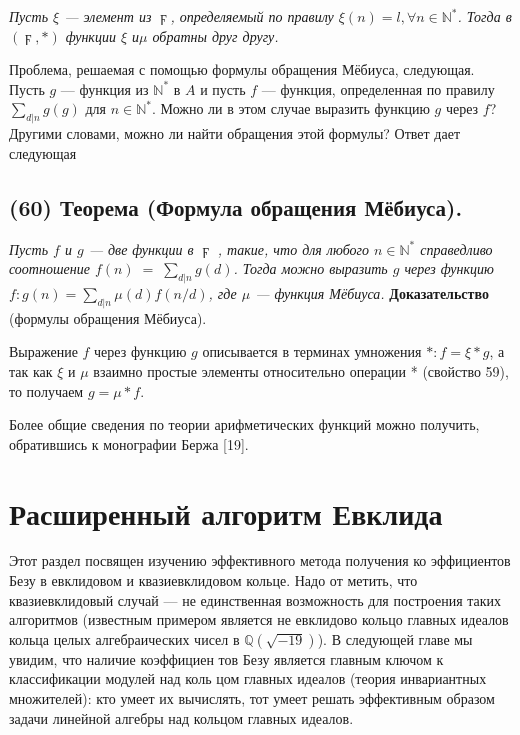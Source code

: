 \documentclass{mai_book}
\begin{document}
\textit{Пусть $\xi$ — элемент из $\digamma$, определяемый по правилу $\xi(n)=l,\forall n\in\mathbb{N}^*$. Тогда в $(\digamma,*)$ функции $\xi$ и$\mu$ обратны друг другу.}

Проблема, решаемая с помощью формулы обращения Мёбиуса, следующая. Пусть $g$ — функция из $\mathbb{N}^*$ в $A$ и пусть $f$ — функция, определенная по правилу $\sum\nolimits_{d|n}g(g)$ для $n\in\mathbb{N}^*$. Можно ли в этом случае выразить функцию $g$ через $f$? Другими словами, можно ли найти обращения этой формулы? Ответ дает следующая

\subsection*{(60) Теорема (Формула обращения Мёбиуса).}

\textit{Пусть $f$ и $g$ — две функции в $\digamma$ , такие, что для любого $n\in\mathbb{N}^*$ справедливо соотношение $f(n)\;=\;\sum\nolimits_{d|n}g(d)$. Тогда можно выразить $g$
через функцию $f: g(n)=\sum\nolimits_{d|n}\mu(d)f(n/d)$, где $\mu$ — функция Мёбиуса.}
\newpage
\textbf{Доказательство} (формулы обращения Мёбиуса).

Выражение $f$ через функцию $g$ описывается в терминах умножения
$*: f = \xi*g$, а так как $\xi$ и $\mu$ взаимно простые элементы относительно
 операции * (свойство 59), то получаем $g= \mu*f$.
 
Более общие сведения по теории арифметических функций можно
получить, обратившись к монографии Бержа [19].
\section{Расширенный алгоритм Евклида}
Этот раздел посвящен изучению эффективного метода получения ко­
эффициентов Безу в евклидовом и квазиевклидовом кольце. Надо от­
метить, что квазиевклидовый случай — не единственная возможность
для построения таких алгоритмов (известным примером является не­
евклидово кольцо главных идеалов кольца целых алгебраических чисел
в $\mathbb{Q}(\sqrt{-19})$). В следующей главе мы увидим, что наличие коэффициен­
тов Безу является главным ключом к классификации модулей над коль­
цом главных идеалов (теория инвариантных множителей): кто умеет их
вычислять, тот умеет решать эффективным образом задачи линейной
алгебры над кольцом главных идеалов.
\end{document}
